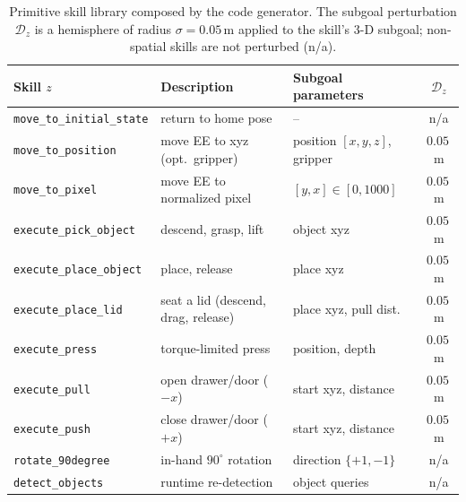 \documentclass{article}
\begin{document}
\begin{table}[h]
\centering
\caption{Primitive skill library composed by the code generator. The subgoal
perturbation $\mathcal{D}_z$ is a hemisphere of radius $\sigma{=}0.05$\,m applied
to the skill's $3$-D subgoal; non-spatial skills are not perturbed (n/a).}
\label{tab:skills}
\small
\setlength{\tabcolsep}{5pt}
\begin{tabular}{lllc}
\toprule
\textbf{Skill $z$} & \textbf{Description} & \textbf{Subgoal parameters} & \textbf{$\mathcal{D}_z$} \\
\midrule
\texttt{move\_to\_initial\_state} & return to home pose                 & --                        & n/a \\
\texttt{move\_to\_position}       & move EE to xyz (opt.\ gripper)      & position $[x,y,z]$, gripper & $0.05$\,m \\
\texttt{move\_to\_pixel}          & move EE to normalized pixel         & $[y,x]\in[0,1000]$        & $0.05$\,m \\
\texttt{execute\_pick\_object}    & descend, grasp, lift                & object xyz                & $0.05$\,m \\
\texttt{execute\_place\_object}   & place, release                      & place xyz                 & $0.05$\,m \\
\texttt{execute\_place\_lid}      & seat a lid (descend, drag, release) & place xyz, pull dist.\    & $0.05$\,m \\
\texttt{execute\_press}           & torque-limited press                & position, depth           & $0.05$\,m \\
\texttt{execute\_pull}            & open drawer/door ($-x$)             & start xyz, distance       & $0.05$\,m \\
\texttt{execute\_push}            & close drawer/door ($+x$)            & start xyz, distance       & $0.05$\,m \\
\texttt{rotate\_90degree}         & in-hand $90^\circ$ rotation         & direction $\{+1,-1\}$     & n/a \\
\texttt{detect\_objects}          & runtime re-detection                & object queries            & n/a \\
\bottomrule
\end{tabular}
\end{table}


\end{document}
